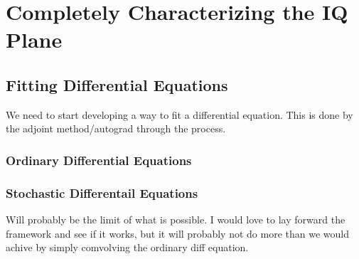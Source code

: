 \chapter{Completely Characterizing the IQ Plane}

\section{Fitting Differential Equations}
We need to start developing a way to fit a differential equation. This is done by the adjoint method/autograd through the process. 

\subsection{Ordinary Differential Equations}

\subsection{Stochastic Differentail Equations}
Will probably be the limit of what is possible. I would love to lay forward the framework and see if it works, but it will probably not do more than we would achive by simply comvolving the ordinary diff equation.